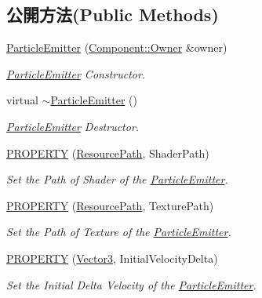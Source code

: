 \subsection*{公開方法(Public Methods)}
\begin{DoxyCompactItemize}
\item 
\hyperlink{class_i_dream_sky_1_1_particle_emitter_a92f38966e1f2c07a03e45d599683d947}{Particle\+Emitter} (\hyperlink{class_i_dream_sky_1_1_component_1_1_owner}{Component\+::\+Owner} \&owner)
\begin{DoxyCompactList}\small\item\em \hyperlink{class_i_dream_sky_1_1_particle_emitter}{Particle\+Emitter} Constructor. \end{DoxyCompactList}\item 
virtual \hyperlink{class_i_dream_sky_1_1_particle_emitter_a6f4952f7555ede99d74d42b30c80f3e2}{$\sim$\+Particle\+Emitter} ()
\begin{DoxyCompactList}\small\item\em \hyperlink{class_i_dream_sky_1_1_particle_emitter}{Particle\+Emitter} Destructor. \end{DoxyCompactList}\item 
\hyperlink{class_i_dream_sky_1_1_particle_emitter_ae1eef597392a8099e0ef5aa56d466d0f}{P\+R\+O\+P\+E\+R\+TY} (\hyperlink{class_i_dream_sky_1_1_resource_path}{Resource\+Path}, Shader\+Path)
\begin{DoxyCompactList}\small\item\em Set the Path of Shader of the \hyperlink{class_i_dream_sky_1_1_particle_emitter}{Particle\+Emitter}. \end{DoxyCompactList}\item 
\hyperlink{class_i_dream_sky_1_1_particle_emitter_af900a92636d1dee0b53de2fe3a2787f8}{P\+R\+O\+P\+E\+R\+TY} (\hyperlink{class_i_dream_sky_1_1_resource_path}{Resource\+Path}, Texture\+Path)
\begin{DoxyCompactList}\small\item\em Set the Path of Texture of the \hyperlink{class_i_dream_sky_1_1_particle_emitter}{Particle\+Emitter}. \end{DoxyCompactList}\item 
\hyperlink{class_i_dream_sky_1_1_particle_emitter_a9dc2bfaae10eff5388dee76c0f79da5c}{P\+R\+O\+P\+E\+R\+TY} (\hyperlink{class_i_dream_sky_1_1_vector3}{Vector3}, Initial\+Velocity\+Delta)
\begin{DoxyCompactList}\small\item\em Set the Initial Delta Velocity of the \hyperlink{class_i_dream_sky_1_1_particle_emitter}{Particle\+Emitter}. \end{DoxyCompactList}\item 

\end{DoxyCompactItemize}
